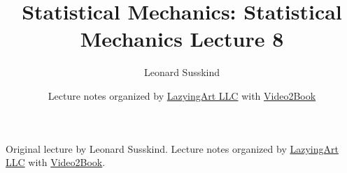 \documentclass[11pt,oneside]{book}
\begin{document}
\frontmatter
\title{Statistical Mechanics: Statistical Mechanics Lecture 8}
\author{Leonard Susskind}
\date{Lecture notes organized by \href{https://lazying.art}{LazyingArt LLC} with \href{https://github.com/lachlanchen/Video2Book}{Video2Book}}
\maketitle
\begin{center}
\small Original lecture by Leonard Susskind. Lecture notes organized by \href{https://lazying.art}{LazyingArt LLC} with \href{https://github.com/lachlanchen/Video2Book}{Video2Book}.
\end{center}
\clearpage
\mainmatter

\end{document}
